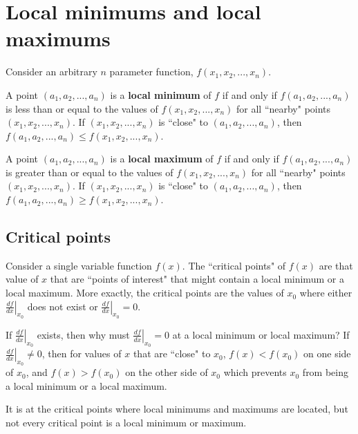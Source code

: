 \documentclass{article}
\begin{document}
\section*{Local minimums and local maximums}

Consider an arbitrary \(n\) parameter function, \(f(x_1, x_2, ..., x_n)\). 

A point \((a_1, a_2, ..., a_n)\) is a {\bf local minimum} of \(f\) if and only if \(f(a_1, a_2, ..., a_n)\) is less than or equal to the values of \(f(x_1, x_2, ..., x_n)\) for all ``nearby" points \((x_1, x_2, ..., x_n)\). If \((x_1, x_2, ..., x_n)\) is ``close" to \((a_1, a_2, ..., a_n)\), then \(f(a_1, a_2, ..., a_n) \leq f(x_1, x_2, ..., x_n)\). 

A point \((a_1, a_2, ..., a_n)\) is a {\bf local maximum} of \(f\) if and only if \(f(a_1, a_2, ..., a_n)\) is greater than or equal to the values of \(f(x_1, x_2, ..., x_n)\) for all ``nearby" points \((x_1, x_2, ..., x_n)\). If \((x_1, x_2, ..., x_n)\) is ``close" to \((a_1, a_2, ..., a_n)\), then \(f(a_1, a_2, ..., a_n) \geq f(x_1, x_2, ..., x_n)\). 




\subsection*{Critical points}

Consider a single variable function \(f(x)\). The ``critical points" of \(f(x)\) are that value of \(x\) that are ``points of interest" that might contain a local minimum or a local maximum. More exactly, the critical points are the values of \(x_0\) where either \(\left.\frac{df}{dx}\right|_{x_0}\) does not exist or \(\left.\frac{df}{dx}\right|_{x_0} = 0\). 

If \(\left.\frac{df}{dx}\right|_{x_0}\) exists, then why must \(\left.\frac{df}{dx}\right|_{x_0} = 0\) at a local minimum or local maximum? If \(\left.\frac{df}{dx}\right|_{x_0} \neq 0\), then for values of \(x\) that are ``close" to \(x_0\), \(f(x) < f(x_0)\) on one side of \(x_0\), and \(f(x) > f(x_0)\) on the other side of \(x_0\) which prevents \(x_0\) from being a local minimum or a local maximum. 

It is at the critical points where local minimums and maximums are located, but not every critical point is a local minimum or maximum.
\end{document}
